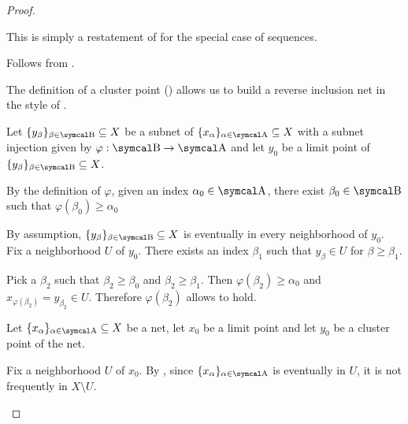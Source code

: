 \begin{proof}\mbox{}
  \begin{description}
     This is simply a restatement of  for the special case of sequences.

     Follows from .

    \mbox{}
    \begin{description}
      \Implies The definition of a cluster point () allows us to build a reverse inclusion net in the style of .

      \ImpliedBy Let \( \{ y_\beta \}_{\beta \in \CB} \subseteq X \) be a subnet of \( \{ x_\al \}_{\al \in \CA} \subseteq X \) with a subnet injection given by \( \varphi: \CB \to \CA \) and let \( y_0 \) be a limit point of \( \{ y_\beta \}_{\beta \in \CB} \subseteq X \).

      By the definition of \( \varphi \), given an index \( \alpha_0 \in \CA \), there exist \( \beta_0 \in \CB \) such that \( \varphi(\beta_0) \geq \alpha_0 \)

      By assumption, \( \{ y_\beta \}_{\beta \in \CB} \subseteq X \) is eventually in every neighborhood of \( y_0 \). Fix a neighborhood \( U \) of \( y_0 \). There exists an index \( \beta_1 \) such that \( y_\beta \in U \) for \( \beta \geq \beta_1 \).

      Pick a \( \beta_2 \) such that \( \beta_2 \geq \beta_0 \) and \( \beta_2 \geq \beta_1 \). Then \( \varphi(\beta_2) \geq \alpha_0 \) and \( x_{\varphi(\beta_2)} = y_{\beta_2} \in U \). Therefore \( \varphi(\beta_2) \) allows  to hold.
    \end{description}

     Let \( \{ x_\al \}_{\al \in \CA} \subseteq X \) be a net, let \( x_0 \) be a limit point and let \( y_0 \) be a cluster point of the net.

    Fix a neighborhood \( U \) of \( x_0 \). By , since \( \{ x_\al \}_{\al \in \CA} \) is eventually in \( U \), it is not frequently in \( X \setminus U \).


\end{description}
\end{proof}
